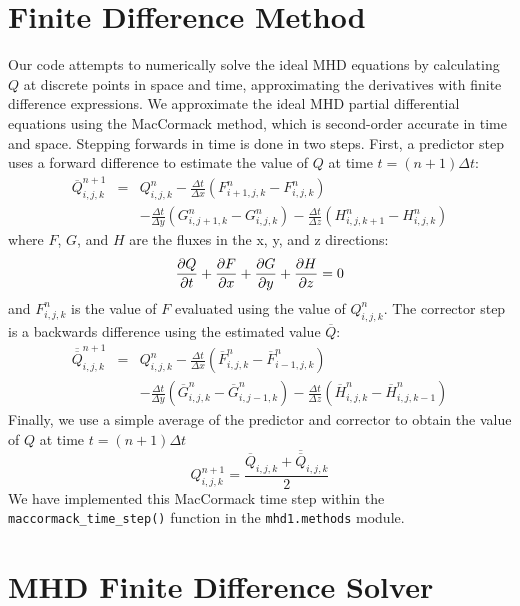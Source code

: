 \documentclass[%
 reprint,
 amsmath,amssymb,
 aps,
]{revtex4-2}
\begin{document}
\section{Finite Difference Method}

Our code attempts to numerically solve the ideal MHD equations by calculating $Q$ at discrete points in space and time, approximating the derivatives with finite difference expressions. We approximate the ideal MHD partial differential equations using the MacCormack method, which is second-order accurate in time and space. Stepping forwards in time is done in two steps. First, a predictor step uses a forward difference to estimate the value of $Q$ at time $t = (n+1)\Delta t$:
\begin{eqnarray*}
\overline{Q} _{i,j,k} ^{n+1} & = & Q_{i,j,k} ^n - \frac{\Delta t}{\Delta x} (F_{i+1, j, k}^n - F_{i, j, k} ^n) \\
& & - \frac{\Delta t}{\Delta y} (G_{i, j+1, k} ^n - G_{i, j, k} ^n) - \frac{\Delta t}{\Delta z} (H_{i, j, k+1} ^n - H_{i, j, k} ^n)
\end{eqnarray*}
where $F$, $G$, and $H$ are the fluxes in the x, y, and z directions:
\begin{equation}
\pdv{Q}{t} + \pdv{F}{x} + \pdv{G}{y} + \pdv{H}{z} = 0
\end{equation}
and $F_{i, j, k} ^n$ is the value of $F$ evaluated using the value of $Q_{i, j, k} ^n$. The corrector step is a backwards difference using the estimated value  $\overline{Q}$:
\begin{eqnarray*}
\overline{\overline{Q}} _{i,j,k} ^{n+1} & = & Q_{i,j,k} ^n - \frac{\Delta t}{\Delta x} (\overline{F}_{i, j, k}^n - \overline{F}_{i-1, j, k} ^n ) \\
& & - \frac{\Delta t}{\Delta y} (\overline{G}_{i, j, k} ^n - \overline{G}_{i, j-1, k} ^n) - \frac{\Delta t}{\Delta z} (\overline{H}_{i, j, k} ^n - \overline{H}_{i, j, k-1} ^n)
\end{eqnarray*}
Finally, we use a simple average of the predictor and corrector to obtain the value of $Q$ at time $t = (n+1) \Delta t$
\begin{equation}
Q_{i, j, k} ^{n+1} = \frac{\overline{Q}_{i, j, k} + \overline{\overline{Q}}_{i, j, k}}{2}
\end{equation}
We have implemented this MacCormack time step within the \texttt{maccormack\_time\_step()} function in the \texttt{mhd1.methods} module.

\section{MHD Finite Difference Solver}
\end{document}
